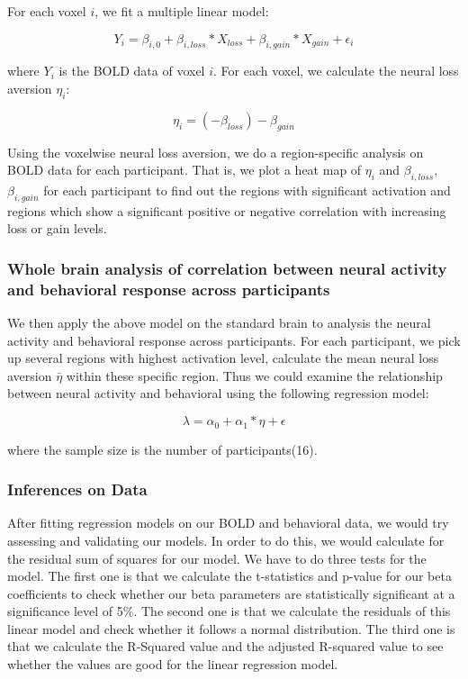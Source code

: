 For each voxel $i$, we fit a multiple linear model:

\begin{equation}
Y_{i} = \beta_{i, 0} + \beta_{i, loss} *X_{loss} + \beta_{i, gain} * X_{gain}  + \epsilon_i
\end{equation}

where $Y_{i}$ is the BOLD data of voxel $i$. For each voxel, we calculate the neural loss aversion $\eta_i$:

\begin{equation}
\eta_i = (-\beta_{loss}) - \beta_{gain}
\end{equation}

Using the voxelwise neural loss aversion, we do a region-specific analysis on BOLD data for each participant. That is, we plot a heat map of $\eta_i$ and  $\beta_{i, loss}$, $ \beta_{i, gain}$ for each participant to find out the regions with significant activation and regions which show a significant positive or negative correlation with increasing loss or gain levels.

\subsubsection{Whole brain analysis of correlation between neural activity and behavioral response across participants}

We then apply the above model on the standard brain to analysis the neural activity and behavioral response across participants. For each participant, we pick up several regions with highest activation level, calculate the mean neural loss aversion $\bar{\eta}$ within these specific region. Thus we could examine the relationship between neural activity and behavioral using the following regression model:

\begin{equation}
\lambda = \alpha_0 + \alpha_1 * \eta + \epsilon
\end{equation}

where the sample size is the number of participants(16).

\subsubsection{Inferences on Data}

After fitting regression models on our BOLD and behavioral data, we would try assessing and validating our models. In order to do this, we would calculate for the residual sum of squares for our model. We have to do three tests for the model. The first one is that we calculate the t-statistics and p-value for our beta coefficients to check whether our beta parameters are statistically significant at a significance level of 5\%. The second one is that we calculate the residuals of this linear model and check whether it follows a normal distribution. The third one is that we calculate the R-Squared value and the adjusted R-squared value to see whether the values are good for the linear regression model.


